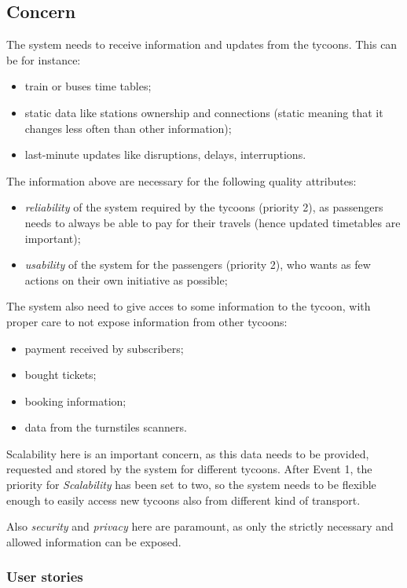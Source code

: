 \subsection*{Concern}
The system needs to receive information and updates from the tycoons. 
This can be for instance:
\begin{itemize}
    \item train or buses time tables;
    \item static data like stations ownership and connections (static meaning that it changes less often than other information);
    \item last-minute updates like disruptions, delays, interruptions.
\end{itemize}
The information above are necessary for the following quality attributes:
\begin{itemize}
    \item \textit{reliability} of the system required by the tycoons (priority 2), as passengers needs to always be able to pay for their travels (hence updated timetables are important);
    \item \textit{usability} of the system for the passengers (priority 2), who wants as few actions on their own initiative as possible;
\end{itemize}

The system also need to give acces to some information to the tycoon, with proper care to not expose information from other tycoons:
\begin{itemize}
    \item payment received by subscribers;
    \item bought tickets;
    \item booking information;
    \item data from the turnstiles scanners. 
\end{itemize}

Scalability here is an important concern, as this data needs to be provided, requested and stored by the system for different tycoons.
After Event 1, the priority for \textit{Scalability} has been set to two, so the system needs to be flexible enough to easily access new tycoons also from different kind of transport.

Also \textit{security} and \textit{privacy} here are paramount, as only the strictly necessary and allowed information can be exposed.

\subsubsection*{User stories}

